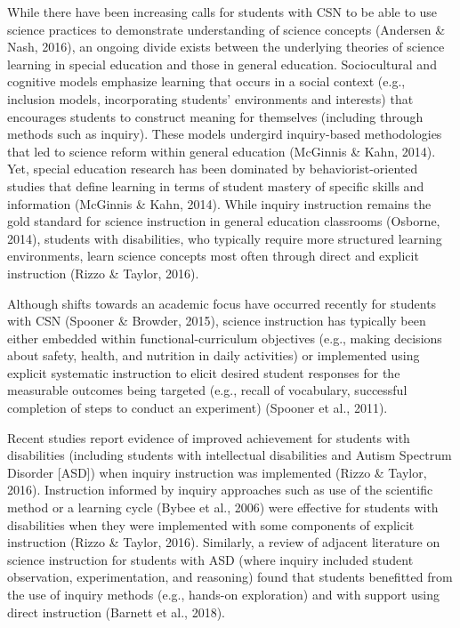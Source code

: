 \documentclass[11.5pt]{sig-alternate} %
\begin{document}
\begin{large}
While there have been increasing calls for students with CSN to be able to use science practices to demonstrate understanding of science concepts (Andersen \& Nash, 2016), an ongoing divide exists between the underlying theories of science learning in special education and those in general education. Sociocultural and cognitive models emphasize learning that occurs in a social context (e.g., inclusion models, incorporating students’ environments and interests) that encourages students to construct meaning for themselves (including through methods such as inquiry). These models undergird inquiry-based methodologies that led to science reform within general education (McGinnis \& Kahn, 2014). Yet, special education research has been dominated by behaviorist-oriented studies that define learning in terms of student mastery of specific skills and information (McGinnis \& Kahn, 2014). While inquiry instruction remains the gold standard for science instruction in general education classrooms (Osborne, 2014), students with disabilities, who typically require more structured learning environments, learn science concepts most often through direct and explicit instruction (Rizzo \& Taylor, 2016).

Although shifts towards an academic focus have occurred recently for students with CSN (Spooner \& Browder, 2015), science instruction has typically been either embedded within functional-curriculum objectives (e.g., making decisions about safety, health, and nutrition in daily activities) or implemented using explicit systematic instruction to elicit desired student responses for the measurable outcomes being targeted (e.g., recall of vocabulary, successful completion of steps to conduct an experiment) (Spooner et al., 2011). 

Recent studies report evidence of improved achievement for students with disabilities (including students with intellectual disabilities and Autism Spectrum Disorder [ASD]) when inquiry instruction was implemented (Rizzo \& Taylor, 2016). Instruction informed by inquiry approaches such as use of the scientific method or a learning cycle (Bybee et al., 2006) were effective for students with disabilities when they were implemented with some components of explicit instruction (Rizzo \& Taylor, 2016). Similarly, a review of adjacent literature on science instruction for students with ASD (where inquiry included student observation, experimentation, and reasoning) found that students benefitted from the use of inquiry methods (e.g., hands-on exploration) and with support using direct instruction (Barnett et al., 2018).


\end{large}
\end{document}
